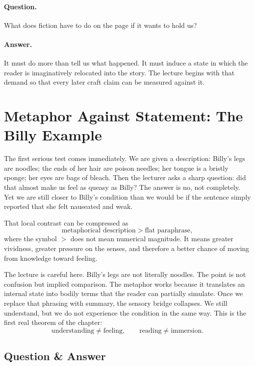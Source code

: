 \paragraph{Question.} What does fiction have to do on the page if it wants to hold us?

\paragraph{Answer.} It must do more than tell us what happened. It must induce a state in which the reader is imaginatively relocated into the story. The lecture begins with that demand so that every later craft claim can be measured against it.

\section{Metaphor Against Statement: The Billy Example}

The first serious test comes immediately. We are given a description: Billy's legs are noodles; the ends of her hair are poison needles; her tongue is a bristly sponge; her eyes are bags of bleach. Then the lecturer asks a sharp question: did that almost make us feel as queasy as Billy? The answer is no, not completely. Yet we are still closer to Billy's condition than we would be if the sentence simply reported that she felt nauseated and weak.

That local contrast can be compressed as
\begin{equation}
\text{metaphorical description} > \text{flat paraphrase},
\end{equation}
where the symbol \(>\) does not mean numerical magnitude. It means greater vividness, greater pressure on the senses, and therefore a better chance of moving from knowledge toward feeling.

The lecture is careful here. Billy's legs are not literally noodles. The point is not confusion but implied comparison. The metaphor works because it translates an internal state into bodily terms that the reader can partially simulate. Once we replace that phrasing with summary, the sensory bridge collapses. We still understand, but we do not experience the condition in the same way. This is the first real theorem of the chapter:
\begin{equation}
\text{understanding} \neq \text{feeling}, \qquad
\text{reading} \neq \text{immersion}.
\end{equation}

\subsection{Question \& Answer}

